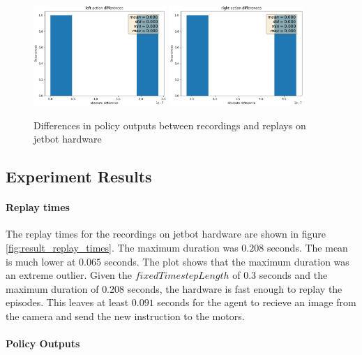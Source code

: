 \begin{figure}
    \centering
    \includegraphics[width=0.45\textwidth]{Bilder/notebook_images/replay_outputs_action_left.png}
    \includegraphics[width=0.45\textwidth]{Bilder/notebook_images/replay_outputs_action_right.png}
    \caption{Differences in policy outputs between recordings and replays on jetbot hardware}
    \label{fig:result_replay_outputs}
\end{figure} %


\subsection{Experiment Results}

\paragraph{Replay times}

The replay times for the recordings on jetbot hardware are shown in figure \ref{fig:result_replay_times}. The maximum duration was $0.208$ seconds. The mean is much lower at $0.065$ seconds. The plot shows that the maximum duration was an extreme outlier.
Given the $fixedTimestepLength$ of $0.3$ seconds and the maximum duration of $0.208$ seconds, the hardware is fast enough to replay the episodes. This leaves at least $0.091$ seconds for the agent to recieve an image from the camera and send the new instruction to the motors.


\paragraph{Policy Outputs}

